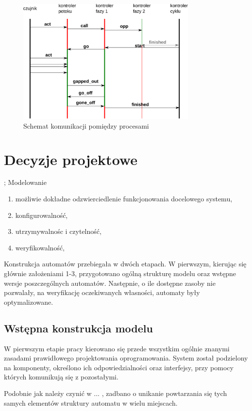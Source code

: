 \documentclass{pracamgr}
\theoremstyle{plain}
\begin{document}
\begin{figure}
  \centering
  \includegraphics[width=0.8\textwidth]{img/models-msc}
  \caption{Schemat komunikacji pomiędzy procesami}
  \label{img:models-msc}
\end{figure}


\section{Decyzje projektowe}
\label{s:models:project};
Modelowanie 
\begin{enumerate}
  \item możliwie dokładne odzwierciedlenie funkcjonowania docelowego systemu,
  \item konfigurowalność,
  \item utrzymywalnośc i czytelność,
  \item weryfikowalność,
\end{enumerate}
Konstrukcja automatów przebiegała w dwóch etapach. W pierwszym,
kierując się głównie założeniami 1-3, przygotowano ogólną strukturę
modelu oraz wstępne wersje poszczególnych automatów. Następnie, o ile
dostępne zasoby nie pozwalały, na weryfikację oczekiwanych własności,
automaty były optymalizowane.

\subsection{Wstępna konstrukcja modelu}

W pierwszym etapie pracy kierowano się przede wszystkim
ogólnie znanymi zasadami prawidłowego projektowania oprogramowania.
System został podzielony na komponenty, określono ich
odpowiedzialności oraz interfejsy, przy pomocy których komunikują się
z pozostałymi.

Podobnie jak należy czynić w ... , zadbano o unikanie powtarzania się tych
samych elementów struktury automatu w wielu miejscach.
\end{document}
